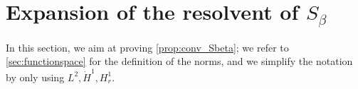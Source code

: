 \documentclass[11pt,reqno]{amsproc}
\def\HH {\dot{H}^1}
\theoremstyle{definition}
\theoremstyle{definition}
\numberwithin{equation}{section}
\begin{document}

\section{Expansion of the resolvent of $S_\beta$}
\label{sec:proof_inverse}
In this section, we aim at proving \cref{prop:conv_Sbeta}; we refer to \cref{sec:functionspace} for the definition of the norms, and we simplify the notation by only using $L^2, \HH, H^1_r$.
\end{document}
